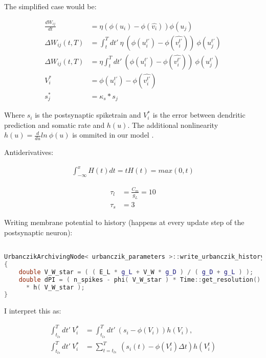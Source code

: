 The simplified \cite{sacramento2018dendritic} case would be:

\begin{align}
  \frac{dW_{ij}}{dt} & = \eta (\phi(u_i) - \phi(\hat{v_i})) \phi(u_j)                                         \\
  \Delta W_{ij}(t,T) & = \int_t^T dt' \ \eta \  (\phi(u_i^{t'}) - \phi(\widehat{v_i^{t'}})) \  \phi(u_j^{t'}) \\
  \Delta W_{ij}(t,T) & = \eta \int_t^T dt' \  (\phi(u_i^{t'}) - \phi(\widehat{v_i^{t'}})) \ \phi(u_j^{t'})    \\
  V_i^*              & = \phi(u_i^{t'}) - \phi(\widehat{v_i^{t'}})                                            \\
  s_j^*              & = \kappa_s * s_j
\end{align}


Where $s_i$ is the postsynaptic spiketrain and $V_i^*$ is the error between dendritic prediction and somatic rate and
$h( u )$. The additional nonlinearity $h( u ) = \frac{d}{du} ln \  \phi(u)$ is ommited in our model .




Antiderivatives:

\begin{align}
  \int_{-\infty}^x H(t)dt = tH(t) = max(0,t)
\end{align}


\begin{align}
  \tau_l & = \frac{C_m}{g_L} = 10 \\
  \tau_s & = 3
\end{align}

Writing membrane potential to history (happens at every update step of the postsynaptic neuron):

\begin{lstlisting}[language=C++, directivestyle={\color{black}}
                   emph={int,char,double,float,unsigned,exp},
                   emphstyle={\color{blue}}]

UrbanczikArchivingNode< urbanczik_parameters >::write_urbanczik_history(Time t, double V_W, int n_spikes, int comp)
{
	double V_W_star = ( ( E_L * g_L + V_W * g_D ) / ( g_D + g_L ) );
	double dPI = ( n_spikes - phi( V_W_star ) * Time::get_resolution().get_ms() )
      * h( V_W_star );
}\end{lstlisting}

I interpret this as:


\begin{align}
  \int_{t_{ls}}^T dt' \ V_i^* & = \int_{t_{ls}}^T dt' \  (s_i - \phi(V_i )) h(V_i),               \\
  \int_{t_{ls}}^T dt' \ V_i^* & = \sum_{t=t_{ls}}^T \  (s_i(t) -  \phi(V_i^t ) \Delta t) h(V_i^t) \\
\end{align}

